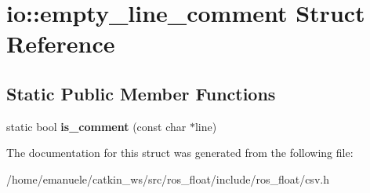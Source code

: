 \hypertarget{structio_1_1empty__line__comment}{}\section{io\+:\+:empty\+\_\+line\+\_\+comment Struct Reference}
\label{structio_1_1empty__line__comment}
\subsection*{Static Public Member Functions}
\begin{DoxyCompactItemize}
\item 
\mbox{\label{structio_1_1empty__line__comment_a88e2cee044a9aafabf3e2a0e64fa5289}} 
static bool {\bfseries is\+\_\+comment} (const char $\ast$line)
\end{DoxyCompactItemize}


The documentation for this struct was generated from the following file\+:\begin{DoxyCompactItemize}
\item 
/home/emanuele/catkin\+\_\+ws/src/ros\+\_\+float/include/ros\+\_\+float/csv.\+h\end{DoxyCompactItemize}
